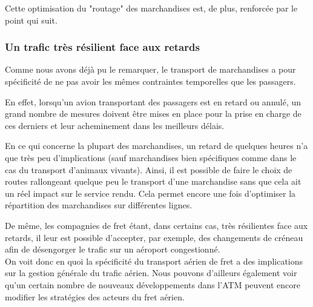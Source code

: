 Cette optimisation du "routage" des marchandises est, de plus, renforcée par le point qui suit.

\subsubsection{Un trafic très résilient face aux retards}

Comme nous avons déjà pu le remarquer, le transport de marchandises a pour spécificité de ne pas avoir les mêmes contraintes temporelles que les passagers.

En effet, lorsqu'un avion transportant des passagers est en retard ou annulé, un grand nombre de mesures doivent être mises en place pour la prise en charge de ces derniers et leur acheminement dans les meilleurs délais.

En ce qui concerne la plupart des marchandises, un retard de quelques heures n'a que très peu d'implications (sauf marchandises bien spécifiques comme dans le cas du transport d'animaux vivants). Ainsi, il est possible de faire le choix de routes rallongeant quelque peu le transport d'une marchandise sans que cela ait un réel impact sur le service rendu. Cela permet encore une fois d'optimiser la répartition des marchandises sur différentes lignes.

De même, les compagnies de fret étant, dans certains cas, très résilientes face aux retards, il leur est possible d'accepter, par exemple, des changements de créneau afin de désengorger le trafic sur un aéroport congestionné.\\

On voit donc en quoi la spécificité du transport aérien de fret a des implications sur la gestion générale du trafic aérien. Nous pouvons d'ailleurs également voir qu'un certain nombre de nouveaux développements dans l'ATM peuvent encore modifier les stratégies des acteurs du fret aérien.